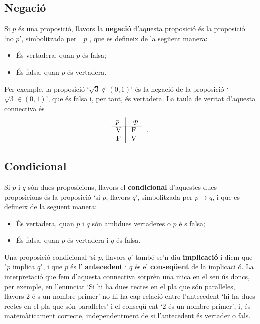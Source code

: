 \subsection{Negaci\'{o}}

Si $p$ \'{e}s una proposici\'{o}, llavors la \textbf{negaci\'{o}} d'aquesta
proposici\'{o} \'{e}s la proposici\'{o} `no $p$', simbolitzada per $\lnot p$%
, que es defineix de la seg\"{u}ent manera:

\begin{itemize}
\item \'{E}s vertadera, quan $p$ \'{e}s falsa;

\item \'{E}s falsa, quan $p$ \'{e}s vertadera.
\end{itemize}

Per exemple, la proposici\'{o} `$\sqrt{3}\notin\left( 0,1\right) $' \'{e}s
la negaci\'{o} de la proposici\'{o} `$\sqrt{3}\in\left( 0,1\right) $', que
\'{e}s falsa i, per tant, \'{e}s vertadera. La taula de veritat d'aquesta
connectiva \'{e}s%
\begin{equation*}
\begin{tabular}{l|l}
$p$ & $\lnot p$ \\ \hline
\multicolumn{1}{c|}{V} & \multicolumn{1}{|c}{F} \\
\multicolumn{1}{c|}{F} & \multicolumn{1}{|c}{V}%
\end{tabular}
\text{.}
\end{equation*}

\subsection{Condicional}

Si $p$ i $q$ s\'{o}n dues proposicions, llavors el \textbf{condicional}
d'aquestes dues proposicions \'{e}s la proposici\'{o} `si $p$, llavors $q$',
simbolitzada per $p\longrightarrow q$, i que es defineix de la seg\"{u}ent
manera:

\begin{itemize}
\item \'{E}s vertadera, quan $p$ i $q$ s\'{o}n ambdues vertaderes o $p$ \'{e}%
s falsa;

\item \'{E}s falsa, quan $p$ \'{e}s vertadera i $q$ \'{e}s falsa.
\end{itemize}

Una proposici\'{o} condicional `si $p$, llavors $q$' tamb\'{e} se'n diu
\textbf{implicaci\'{o}} i diem que "$p$ implica $q$", i que $p$ \'{e}s l'%
\textbf{antecedent} i $q$ \'{e}s el \textbf{conseq\"{u}ent} de la implicaci%
\'{o}. La interpretaci\'{o} que fem d'aquesta connectiva sorpr\`{e}n una
mica en el seu \'{u}s doncs, per exemple, en l'enunciat `Si hi ha dues
rectes en el pla que s\'{o}n paral\textperiodcentered leles, llavors 2 \'{e}%
s un nombre primer' no hi ha cap relaci\'{o} entre l'antecedent `hi ha dues
rectes en el pla que s\'{o}n paral\textperiodcentered leles' i el conseq\"{u}%
ent `$2$ \'{e}s un nombre primer', i, \'{e}s matem\`{a}ticament correcte,
independentment de si l'antecedent \'{e}s vertader o fals.

